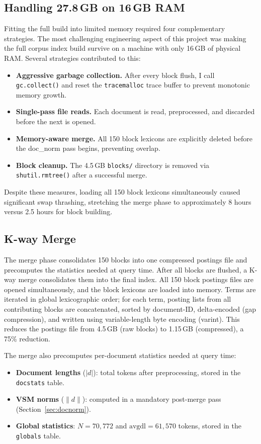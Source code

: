 \documentclass[sigconf,nonacm]{acmart}
\begin{document}
\subsection{Handling 27.8\,GB on 16\,GB RAM}
Fitting the full build into limited memory required four complementary strategies.
The most challenging engineering aspect of this project was making the full
corpus index build survive on a machine with only 16\,GB of physical RAM.
Several strategies contributed to this:
\begin{itemize}[nosep]
  \item \textbf{Aggressive garbage collection.}  After every block flush, I
        call \texttt{gc.collect()} and reset the \texttt{tracemalloc} trace
        buffer to prevent monotonic memory growth.
  \item \textbf{Single-pass file reads.}  Each document is read, preprocessed,
        and discarded before the next is opened.
  \item \textbf{Memory-aware merge.}  All 150 block lexicons are explicitly
        deleted before the doc\_norm pass begins, preventing overlap.
  \item \textbf{Block cleanup.}  The 4.5\,GB \texttt{blocks/} directory is
        removed via \texttt{shutil.rmtree()} after a successful merge.
\end{itemize}
Despite these measures, loading all 150 block lexicons simultaneously caused
significant swap thrashing, stretching the merge phase to approximately 8 hours
versus 2.5 hours for block building.

\subsection{K-way Merge}
The merge phase consolidates 150 blocks into one compressed postings file and
precomputes the statistics needed at query time.
After all blocks are flushed, a K-way merge consolidates them into the final
index.  All 150 block postings files are opened simultaneously, and the
block lexicons are loaded into memory.  Terms are iterated in global
lexicographic order; for each term, posting lists from all contributing blocks
are concatenated, sorted by document-ID, delta-encoded (gap compression), and
written using variable-length byte encoding (varint).  This reduces the
postings file from 4.5\,GB (raw blocks) to 1.15\,GB (compressed), a 75\%
reduction.

The merge also precomputes per-document statistics needed at query time:
\begin{itemize}[nosep]
  \item \textbf{Document lengths} ($|d|$): total tokens after preprocessing,
        stored in the \texttt{docstats} table.
  \item \textbf{VSM norms} ($\|d\|$): computed in a mandatory post-merge pass
        (Section~\ref{sec:docnorm}).
  \item \textbf{Global statistics}: $N = 70{,}772$ and
        $\text{avgdl} = 61{,}570$ tokens, stored in the \texttt{globals} table.
\end{itemize}
\end{document}

